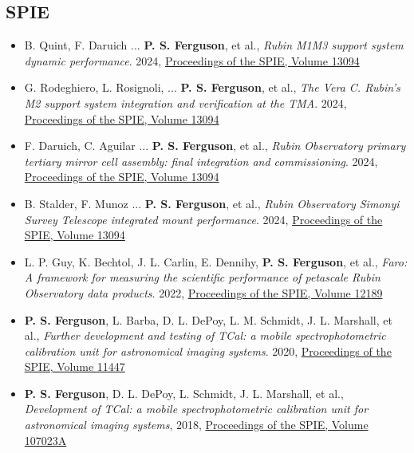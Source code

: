\subsection{SPIE}
\begin{itemize}[itemsep=1pt]

    \item B. Quint, F. Daruich ... \textbf{P. S. Ferguson}, et al., \textit{Rubin M1M3 support system dynamic performance}. 2024,  \href{https://doi.org/10.1117/12.3019268}{Proceedings of the SPIE, Volume 13094}
    \item G. Rodeghiero, L. Rosignoli, ... \textbf{P. S. Ferguson}, et al., \textit{The Vera C. Rubin's M2 support system integration and verification at the TMA}. 2024,  \href{https://doi.org/10.1117/12.3019210}{Proceedings of the SPIE, Volume 13094}
    \item F. Daruich, C. Aguilar ... \textbf{P. S. Ferguson}, et al., \textit{Rubin Observatory primary tertiary mirror cell assembly: final integration and commissioning}. 2024,  \href{https://doi.org/10.1117/12.3036881}{Proceedings of the SPIE, Volume 13094}
    \item B. Stalder, F. Munoz ... \textbf{P. S. Ferguson}, et al., \textit{Rubin Observatory Simonyi Survey Telescope integrated mount performance}. 2024,  \href{https://doi.org/10.1117/12.3019266}{Proceedings of the SPIE, Volume 13094}
    \item L. P. Guy, K. Bechtol, J. L. Carlin, E. Dennihy, \textbf{P. S. Ferguson}, et al., \textit{Faro: A framework for measuring the scientific performance of petascale Rubin Observatory data products}. 2022, \href{https://arxiv.org/abs/2206.15447}{Proceedings of the SPIE, Volume 12189}
    \item \textbf{P. S. Ferguson}, L. Barba, D. L. DePoy, L. M. Schmidt, J. L. Marshall, et al., \textit{Further development and testing of TCal: a mobile spectrophotometric calibration unit for astronomical imaging systems}. 2020,  \href{https://doi.org/10.1117/12.2562736}{Proceedings of the SPIE, Volume 11447}
    \item \textbf{P. S. Ferguson}, D. L. DePoy, L. Schmidt, J. L. Marshall, et al., \textit{Development of TCal: a mobile spectrophotometric calibration unit for astronomical imaging systems}, 2018, \href{https://doi.org/10.1117/12.2313752}{Proceedings of the SPIE, Volume 107023A}
\end{itemize}
